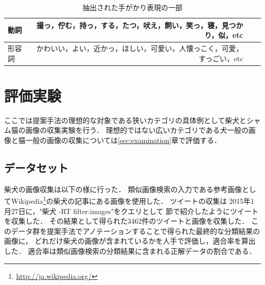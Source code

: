 
\begin{table}[bt]
\begin{center}
\caption{抽出された手がかり表現の一部}
\label{tab:predicate}
\begin{tabular}{|l|r|r|r|}\hline
動詞& 撮っ，佇む，持っ，する，たつ，吠え，飼い，笑っ，寝，見つかり，似，etc \\ \hline
形容詞& かわいい，よい，近かっ，ほしい，可愛い，人懐っこく，可愛，すっごい，etc \\ \hline
\end{tabular}
\end{center}
\end{table}



\chapter{評価実験}
\label{sec:experiment}

ここでは提案手法の理想的な対象である狭いカテゴリの具体例として柴犬とシャム猫の画像の収集実験を行う．
理想的ではない広いカテゴリである犬一般の画像と猫一般の画像の収集については\ref{sec:examination}章で評価する．

\section{データセット}


柴犬の画像収集は以下の様に行った．
類似画像検索の入力である参考画像としてWikipedia\footnote{\url{http://ja.wikipedia.org/}}の柴犬の記事にある画像を使用した．
ツイートの収集は
2015年1月27日に，"柴犬 -RT filter:images"をクエリとして
\label{sec:tweetCollect}節で紹介したようにツイートを収集した．
その結果として得られた3462件のツイートと画像を収集した．
このデータ群を提案手法でアノテーションすることで得られた最終的な分類結果の画像に，
どれだけ柴犬の画像が含まれているかを人手で評価し，適合率を算出した．
適合率は類似画像検索の分類結果に含まれる正解データの割合である．

